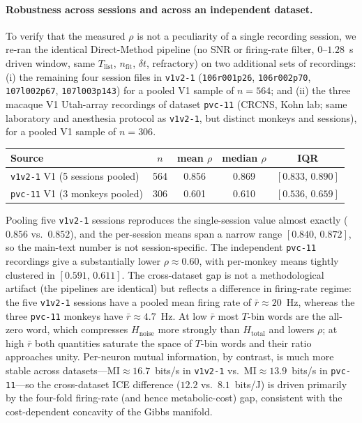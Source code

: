\documentclass[11pt]{article}
\theoremstyle{remark}
\theoremstyle{definition}
\begin{document}
\paragraph{Robustness across sessions and across an independent dataset.}
To verify that the measured $\rho$ is not a peculiarity of a single recording session, we re-ran the identical Direct-Method pipeline (no SNR or firing-rate filter, $0$--$1.28$~s driven window, same $T_{\mathrm{list}}$, $n_{\mathrm{fit}}$, $\delta t$, refractory) on two additional sets of recordings: (i) the remaining four session files in \texttt{v1v2-1} (\texttt{106r001p26}, \texttt{106r002p70}, \texttt{107l002p67}, \texttt{107l003p143}) for a pooled V1 sample of $n=564$; and (ii) the three macaque V1 Utah-array recordings of dataset \texttt{pvc-11} (CRCNS, Kohn lab; same laboratory and anesthesia protocol as \texttt{v1v2-1}, but distinct monkeys and sessions), for a pooled V1 sample of $n=306$.
\begin{center}
\begin{tabular}{lcccc}
\toprule
Source & $n$ & mean $\rho$ & median $\rho$ & IQR \\
\midrule
\texttt{v1v2-1} V1 (5 sessions pooled) & 564 & 0.856 & 0.869 & $[0.833,\,0.890]$ \\
\texttt{pvc-11} V1 (3 monkeys pooled) & 306 & 0.601 & 0.610 & $[0.536,\,0.659]$ \\
\bottomrule
\end{tabular}
\end{center}
Pooling five \texttt{v1v2-1} sessions reproduces the single-session value almost exactly ($0.856$ vs.\ $0.852$), and the per-session means span a narrow range $[0.840,\,0.872]$, so the main-text number is not session-specific.  The independent \texttt{pvc-11} recordings give a substantially lower $\rho\approx 0.60$, with per-monkey means tightly clustered in $[0.591,\,0.611]$.  The cross-dataset gap is not a methodological artifact (the pipelines are identical) but reflects a difference in firing-rate regime: the five \texttt{v1v2-1} sessions have a pooled mean firing rate of $\bar r\approx 20$~Hz, whereas the three \texttt{pvc-11} monkeys have $\bar r\approx 4.7$~Hz.  At low $\bar r$ most $T$-bin words are the all-zero word, which compresses $H_{\mathrm{noise}}$ more strongly than $H_{\mathrm{total}}$ and lowers $\rho$; at high $\bar r$ both quantities saturate the space of $T$-bin words and their ratio approaches unity.  Per-neuron mutual information, by contrast, is much more stable across datasets---$\mathrm{MI}\approx 16.7$~bits/s in \texttt{v1v2-1} vs.\ $\mathrm{MI}\approx 13.9$~bits/s in \texttt{pvc-11}---so the cross-dataset ICE difference ($12.2$ vs.\ $8.1$~bits/J) is driven primarily by the four-fold firing-rate (and hence metabolic-cost) gap, consistent with the cost-dependent concavity of the Gibbs manifold.
\end{document}
